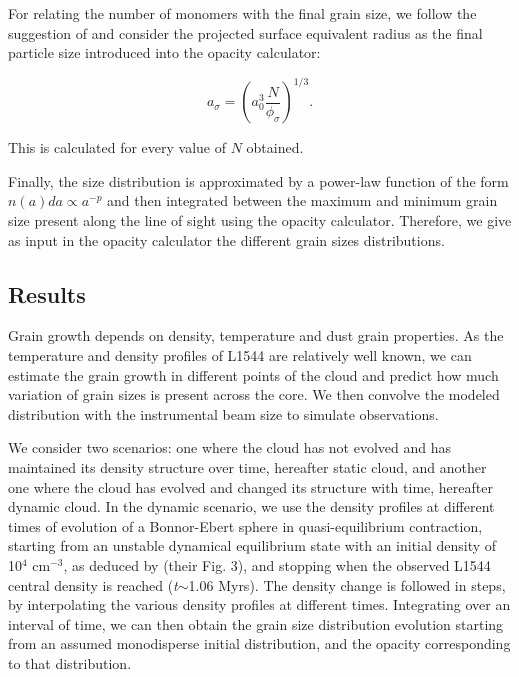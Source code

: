 \documentclass{aa}
\begin{document}
For relating the number of monomers with the final grain size, we follow the suggestion of  and consider the projected surface equivalent radius as the final particle size introduced into the opacity calculator:

\begin{equation}
a_{\sigma} = \left( a_0 ^3 \frac{N}{\phi_{\sigma}} \right) ^{1/3} .
\end{equation}

This is calculated for every value of $N$ obtained. 

Finally, the size distribution is approximated by a power-law function of the form $n(a)da \propto a^{-p}$  and then integrated between the maximum and minimum grain size present along the line of sight using the opacity calculator. Therefore, we give as input in the opacity calculator the different grain sizes distributions.


\subsection{Results}

Grain growth depends on density, temperature and dust grain properties. As the temperature and density profiles of L1544 are relatively well known, we can estimate the grain growth in different points of the cloud and predict how much variation of grain sizes is present across the core. We then convolve the modeled distribution with the instrumental beam size to simulate observations.  

We consider two scenarios: one where the cloud has not evolved and has maintained its density structure over time, hereafter static cloud, and another one where the cloud has evolved and changed its structure with time, hereafter dynamic cloud. In the dynamic scenario, we use the density profiles at different times of evolution of a Bonnor-Ebert sphere in quasi-equilibrium contraction, starting from an unstable dynamical equilibrium state with an initial density of 10$^4$ cm$^{-3}$, as deduced by  (their Fig. 3), and stopping when the observed L1544 central density is reached (\textit{t}$\sim$1.06 Myrs). The density change is followed in steps, by interpolating the various density profiles at different times. Integrating over an interval of time, we can then obtain the grain size distribution evolution starting from an assumed monodisperse initial distribution, and the opacity corresponding to that distribution. 
\end{document}
